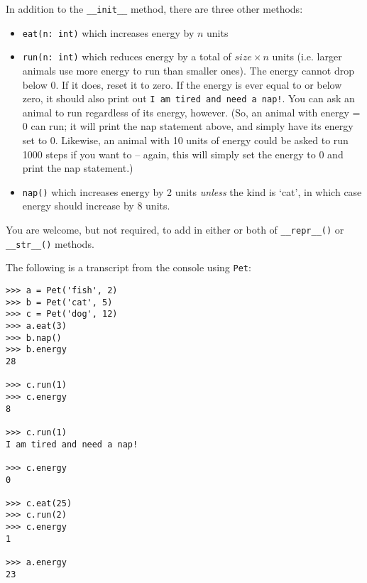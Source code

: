 \documentclass{article}
\begin{document}
\begin{enumerate}
In addition to the \verb|__init__| method, there are three other methods:
\begin{itemize}
  \item \verb|eat(n: int)| which increases energy by $n$ units
  \item \verb|run(n: int)| which reduces energy by a total of $size \times n$ units (i.e. larger animals use more energy to run than smaller ones). The energy cannot drop below 0. If it does, reset it to zero. If the energy is ever equal to or below zero, it should also print out \verb|I am tired and need a nap!|. You can ask an animal to run regardless of its energy, however. (So, an animal with energy = 0 can run; it will print the nap statement above, and simply have its energy set to 0. Likewise, an animal with 10 units of energy could be asked to run 1000 steps if you want to -- again, this will simply set the energy to 0 and print the nap statement.)
  \item \verb|nap()| which increases energy by 2 units \emph{unless} the kind is `cat', in which case energy should increase by 8 units.
\end{itemize}

You are welcome, but not required, to add in either or both of \verb|__repr__()| or \verb|__str__()| methods.

The following is a transcript from the console using \verb|Pet|:

\begin{verbatim}
>>> a = Pet('fish', 2)
>>> b = Pet('cat', 5)
>>> c = Pet('dog', 12)
>>> a.eat(3)
>>> b.nap()
>>> b.energy
28

>>> c.run(1)
>>> c.energy
8

>>> c.run(1)
I am tired and need a nap!

>>> c.energy
0

>>> c.eat(25)
>>> c.run(2)
>>> c.energy
1

>>> a.energy
23


\end{verbatim}

\end{enumerate}
\end{document}
